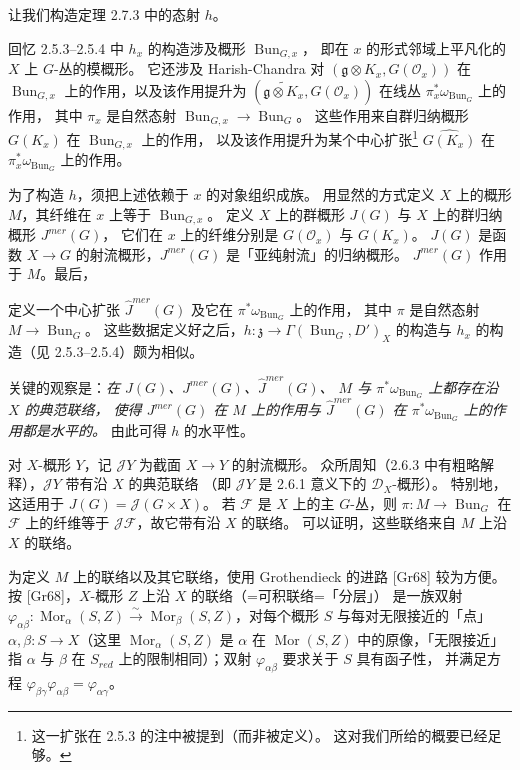 让我们构造定理 2.7.3 中的态射 $h$。

回忆 2.5.3--2.5.4 中 $h_x$ 的构造涉及概形 $\operatorname{Bun}_{G,x}$，
即在 $x$ 的形式邻域上平凡化的 $X$ 上 $G$-丛的模概形。
它还涉及 Harish-Chandra 对 $(\mathfrak{g}\otimes K_x,G(\mathcal{O}_x))$
在 $\operatorname{Bun}_{G,x}$ 上的作用，以及该作用提升为
$(\widetilde{\mathfrak{g}\otimes K_x},G(\mathcal{O}_x))$ 在线丛
$\pi_x^*\omega_{\operatorname{Bun}_G}$ 上的作用，
其中 $\pi_x$ 是自然态射 $\operatorname{Bun}_{G,x}\to\operatorname{Bun}_G$。
这些作用来自群归纳概形 $G(K_x)$ 在 $\operatorname{Bun}_{G,x}$ 上的作用，
以及该作用提升为某个中心扩张\footnote{这一扩张在 2.5.3 的注中被提到（而非被定义）。
这对我们所给的概要已经足够。} $\widehat{G(K_x)}$ 在
$\pi_x^*\omega_{\operatorname{Bun}_G}$ 上的作用。

为了构造 $h$，须把上述依赖于 $x$ 的对象组织成族。
用显然的方式定义 $X$ 上的概形 $M$，其纤维在 $x$ 上等于 $\operatorname{Bun}_{G,x}$。
定义 $X$ 上的群概形 $J(G)$ 与 $X$ 上的群归纳概形 $J^{mer}(G)$，
它们在 $x$ 上的纤维分别是 $G(\mathcal{O}_x)$ 与 $G(K_x)$。
$J(G)$ 是函数 $X\to G$ 的射流概形，$J^{mer}(G)$ 是「亚纯射流」的归纳概形。
$J^{mer}(G)$ 作用于 $M$。最后，


定义一个中心扩张 $\widehat{J}^{mer}(G)$ 及它在
$\pi^*\omega_{\operatorname{Bun}_G}$ 上的作用，
其中 $\pi$ 是自然态射 $M\to\operatorname{Bun}_G$。
这些数据定义好之后，$h:\mathfrak{z}\to\Gamma(\operatorname{Bun}_G,D')_X$
的构造与 $h_x$ 的构造（见 2.5.3--2.5.4）颇为相似。

 关键的观察是：\emph{在 $J(G)$、$J^{mer}(G)$、$\widehat{J}^{mer}(G)$、
$M$ 与 $\pi^*\omega_{\operatorname{Bun}_G}$ 上都存在沿 $X$ 的典范联络，
使得 $J^{mer}(G)$ 在 $M$ 上的作用与 $\widehat{J}^{mer}(G)$ 在
$\pi^*\omega_{\operatorname{Bun}_G}$ 上的作用都是水平的。}
由此可得 $h$ 的水平性。

对 $X$-概形 $Y$，记 $\mathcal{J}Y$ 为截面 $X\to Y$ 的射流概形。
众所周知（2.6.3 中有粗略解释），$\mathcal{J}Y$ 带有沿 $X$ 的典范联络
（即 $\mathcal{J}Y$ 是 2.6.1 意义下的 $\mathcal{D}_X$-概形）。
特别地，这适用于 $J(G)=\mathcal{J}(G\times X)$。
若 $\mathcal{F}$ 是 $X$ 上的主 $G$-丛，则 $\pi:M\to\operatorname{Bun}_G$
在 $\mathcal{F}$ 上的纤维等于 $\mathcal{J}\mathcal{F}$，故它带有沿 $X$ 的联络。
可以证明，这些联络来自 $M$ 上沿 $X$ 的联络。

为定义 $M$ 上的联络以及其它联络，使用 Grothendieck 的进路 [Gr68] 较为方便。
按 [Gr68]，$X$-概形 $Z$ 上沿 $X$ 的联络（=可积联络=「分层」）
是一族双射 $\varphi_{\alpha\beta}:\operatorname{Mor}_\alpha(S,Z)\xrightarrow{\sim}
\operatorname{Mor}_\beta(S,Z)$，对每个概形 $S$ 与每对无限接近的「点」
$\alpha,\beta:S\to X$（这里 $\operatorname{Mor}_\alpha(S,Z)$ 是 $\alpha$ 在
$\operatorname{Mor}(S,Z)$ 中的原像，「无限接近」指 $\alpha$ 与 $\beta$ 在
$S_{red}$ 上的限制相同）；双射 $\varphi_{\alpha\beta}$ 要求关于 $S$ 具有函子性，
并满足方程 $\varphi_{\beta\gamma}\varphi_{\alpha\beta}=\varphi_{\alpha\gamma}$。

